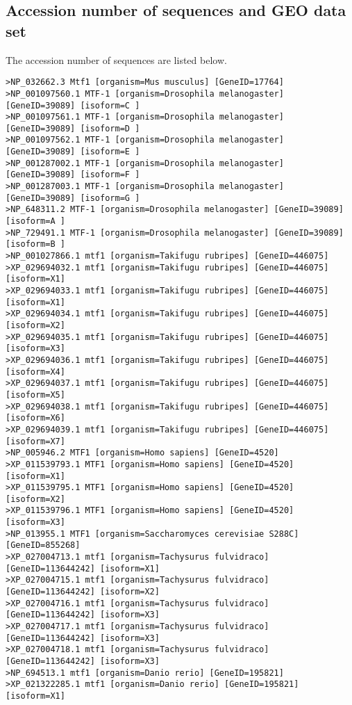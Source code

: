 \subsection*{Accession number of sequences and GEO data set}
The accession number of sequences are listed below.
\begin{lstlisting}[basicstyle=\tiny\ttfamily]
>NP_032662.3 Mtf1 [organism=Mus musculus] [GeneID=17764]
>NP_001097560.1 MTF-1 [organism=Drosophila melanogaster] [GeneID=39089] [isoform=C ]
>NP_001097561.1 MTF-1 [organism=Drosophila melanogaster] [GeneID=39089] [isoform=D ]
>NP_001097562.1 MTF-1 [organism=Drosophila melanogaster] [GeneID=39089] [isoform=E ]
>NP_001287002.1 MTF-1 [organism=Drosophila melanogaster] [GeneID=39089] [isoform=F ]
>NP_001287003.1 MTF-1 [organism=Drosophila melanogaster] [GeneID=39089] [isoform=G ]
>NP_648311.2 MTF-1 [organism=Drosophila melanogaster] [GeneID=39089] [isoform=A ]
>NP_729491.1 MTF-1 [organism=Drosophila melanogaster] [GeneID=39089] [isoform=B ]
>NP_001027866.1 mtf1 [organism=Takifugu rubripes] [GeneID=446075]
>XP_029694032.1 mtf1 [organism=Takifugu rubripes] [GeneID=446075] [isoform=X1]
>XP_029694033.1 mtf1 [organism=Takifugu rubripes] [GeneID=446075] [isoform=X1]
>XP_029694034.1 mtf1 [organism=Takifugu rubripes] [GeneID=446075] [isoform=X2]
>XP_029694035.1 mtf1 [organism=Takifugu rubripes] [GeneID=446075] [isoform=X3]
>XP_029694036.1 mtf1 [organism=Takifugu rubripes] [GeneID=446075] [isoform=X4]
>XP_029694037.1 mtf1 [organism=Takifugu rubripes] [GeneID=446075] [isoform=X5]
>XP_029694038.1 mtf1 [organism=Takifugu rubripes] [GeneID=446075] [isoform=X6]
>XP_029694039.1 mtf1 [organism=Takifugu rubripes] [GeneID=446075] [isoform=X7]
>NP_005946.2 MTF1 [organism=Homo sapiens] [GeneID=4520]
>XP_011539793.1 MTF1 [organism=Homo sapiens] [GeneID=4520] [isoform=X1]
>XP_011539795.1 MTF1 [organism=Homo sapiens] [GeneID=4520] [isoform=X2]
>XP_011539796.1 MTF1 [organism=Homo sapiens] [GeneID=4520] [isoform=X3]
>NP_013955.1 MTF1 [organism=Saccharomyces cerevisiae S288C] [GeneID=855268]
>XP_027004713.1 mtf1 [organism=Tachysurus fulvidraco] [GeneID=113644242] [isoform=X1]
>XP_027004715.1 mtf1 [organism=Tachysurus fulvidraco] [GeneID=113644242] [isoform=X2]
>XP_027004716.1 mtf1 [organism=Tachysurus fulvidraco] [GeneID=113644242] [isoform=X3]
>XP_027004717.1 mtf1 [organism=Tachysurus fulvidraco] [GeneID=113644242] [isoform=X3]
>XP_027004718.1 mtf1 [organism=Tachysurus fulvidraco] [GeneID=113644242] [isoform=X3]
>NP_694513.1 mtf1 [organism=Danio rerio] [GeneID=195821]
>XP_021322285.1 mtf1 [organism=Danio rerio] [GeneID=195821] [isoform=X1]

\end{lstlisting}
